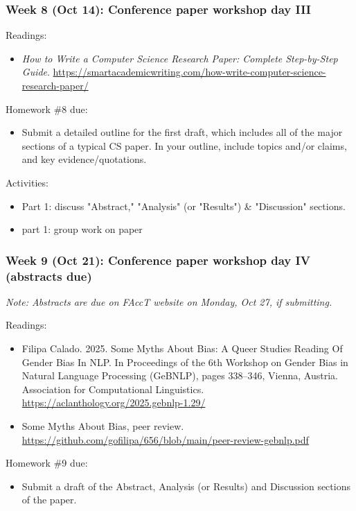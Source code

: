 \documentclass[12pt]{article}
\begin{document}
\subsubsection*{Week 8 (Oct 14): Conference paper workshop day III}
\label{sec:orgc1ad74d}
Readings:
\begin{itemize}
\item \emph{How to Write a Computer Science Research Paper: Complete
Step-by-Step Guide}.
\url{https://smartacademicwriting.com/how-write-computer-science-research-paper/}
\end{itemize}

Homework \#8 due:
\begin{itemize}
\item Submit a detailed outline for the first draft, which includes all of
the major sections of a typical CS paper. In your outline, include
topics and/or claims, and key evidence/quotations.
\end{itemize}

Activities:
\begin{itemize}
\item Part 1: discuss "Abstract," "Analysis" (or "Results") \& "Discussion"
sections.
\item part 1: group work on paper
\end{itemize}

\subsubsection*{Week 9 (Oct 21): Conference paper workshop day IV (abstracts due)}
\label{sec:org9bfc7a4}
\emph{Note: Abstracts are due on FAccT website on Monday, Oct 27, if
submitting.}

Readings:
\begin{itemize}
\item Filipa Calado. 2025. Some Myths About Bias: A Queer Studies Reading
Of Gender Bias In NLP. In Proceedings of the 6th Workshop on Gender
Bias in Natural Language Processing (GeBNLP), pages 338–346, Vienna,
Austria. Association for Computational Linguistics.
\url{https://aclanthology.org/2025.gebnlp-1.29/}
\item Some Myths About Bias, peer review.
\url{https://github.com/gofilipa/656/blob/main/peer-review-gebnlp.pdf}
\end{itemize}

Homework \#9 due:
\begin{itemize}
\item Submit a draft of the Abstract, Analysis (or Results) and Discussion
sections of the paper.
\end{itemize}
\end{document}

